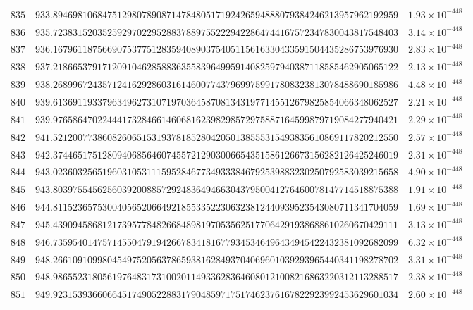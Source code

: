 \documentclass[12pt,reqno]{amsart}
\theoremstyle{remark}
\begin{document}
\begin{longtable}{clc}
$835$ & $933.8946981068475129807890871478480517192426594888079384246213957962192959$ & $1.93\times 10^{-448}$ \\
$836$ & $935.7238315203525929702295288378897552229422864744167572347830043817548403$ & $3.14\times 10^{-448}$ \\
$837$ & $936.1679611875669075377512835940890375405115616330433591504435286753976930$ & $2.83\times 10^{-448}$ \\
$838$ & $937.2186653791712091046285883635583964995914082597940387118585462905065122$ & $2.13\times 10^{-448}$ \\
$839$ & $938.2689967243571241629286031614600774379699759917808323813078488690185986$ & $4.48\times 10^{-448}$ \\
$840$ & $939.6136911933796349627310719703645870813431977145512679825854066348062527$ & $2.21\times 10^{-448}$ \\
$841$ & $939.9765864702244417328466146068162398298572975887164599879719084277940421$ & $2.29\times 10^{-448}$ \\
$842$ & $941.5212007738608260651531937818528042050138555315493835610869117820212550$ & $2.57\times 10^{-448}$ \\
$843$ & $942.3744651751280940685646074557212903006654351586126673156282126425246019$ & $2.31\times 10^{-448}$ \\
$844$ & $943.0236032565196031053111595284677349333846792539883230250792583039215658$ & $4.90\times 10^{-448}$ \\
$845$ & $943.8039755456256039200885729248364946630437950041276460078147714518875388$ & $1.91\times 10^{-448}$ \\
$846$ & $944.8115236575300405652066492185533522306323812440939523543080711341704059$ & $1.69\times 10^{-448}$ \\
$847$ & $945.4390945868121739577848266848981970535625177064291938688610260670429111$ & $3.13\times 10^{-448}$ \\
$848$ & $946.7359540147571455047919426678341816779345346496434945422432381092682099$ & $6.32\times 10^{-448}$ \\
$849$ & $948.2661091099804549752056378659381628493704069601039293965440341198278702$ & $3.31\times 10^{-448}$ \\
$850$ & $948.9865523180561976483173100201149336283646080121008216863220312113288517$ & $2.38\times 10^{-448}$ \\
$851$ & $949.9231539366066451749052288317904859717517462376167822923992453629601034$ & $2.60\times 10^{-448}$ \\

\end{longtable}
\end{document}
